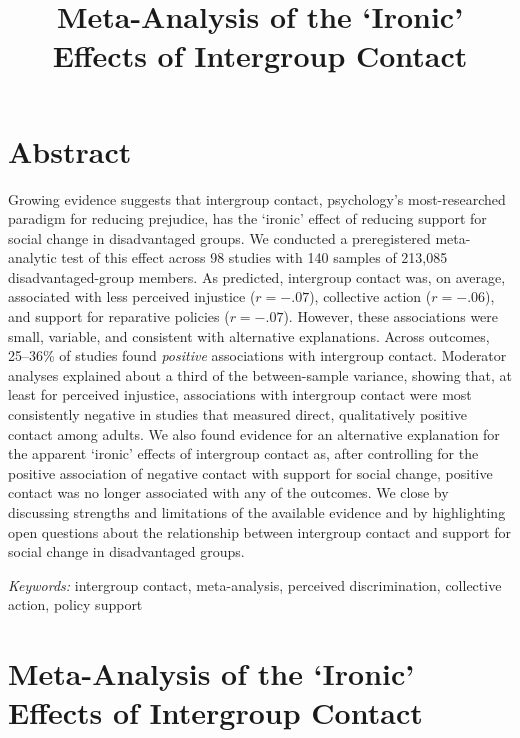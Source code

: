 \documentclass[12pt, letterpaper]{article}
\title{ Meta-Analysis of the `Ironic' Effects of Intergroup Contact }
\begin{document}
\section{Abstract}

\noindent Growing evidence suggests that intergroup contact,
psychology's most-researched paradigm for reducing prejudice, has the
`ironic' effect of reducing support for social change in disadvantaged
groups. We conducted a preregistered meta-analytic test of this effect
across 98 studies with 140 samples of 213,085 disadvantaged-group
members. As predicted, intergroup contact was, on average, associated
with less perceived injustice (\(r = -.07\)), collective action
(\(r = -.06\)), and support for reparative policies (\(r = -.07\)).
However, these associations were small, variable, and consistent with
alternative explanations. Across outcomes, 25--36\% of studies found
\emph{positive} associations with intergroup contact. Moderator analyses
explained about a third of the between-sample variance, showing that, at
least for perceived injustice, associations with intergroup contact were
most consistently negative in studies that measured direct,
qualitatively positive contact among adults. We also found evidence for
an alternative explanation for the apparent `ironic' effects of
intergroup contact as, after controlling for the positive association of
negative contact with support for social change, positive contact was no
longer associated with any of the outcomes. We close by discussing
strengths and limitations of the available evidence and by highlighting
open questions about the relationship between intergroup contact and
support for social change in disadvantaged groups.

\textit{Keywords:} intergroup contact, meta-analysis, perceived
discrimination, collective action, policy support

\newpage

\section{Meta-Analysis of the `Ironic' Effects of Intergroup Contact}
\end{document}
